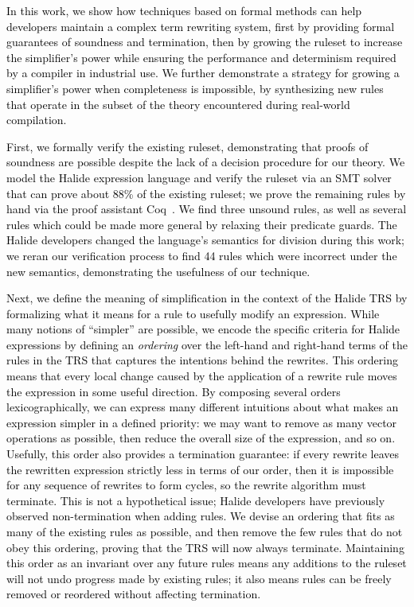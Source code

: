 \documentclass[acmsmall,review]{acmart}\settopmatter{printfolios=true,printccs=false,printacmref=false}
\newcommand{\modified}[1]{\textcolor{black}{{#1}}}
\begin{document}
\modified{ In this work, we show how techniques based on formal methods can help developers
 maintain a complex term rewriting system, first by providing formal guarantees 
 of soundness and termination, then by growing the ruleset to increase the simplifier's 
 power while ensuring the performance and determinism required by a compiler in 
 industrial use.  We further demonstrate a strategy for growing a simplifier's power
 when completeness is impossible, by synthesizing new rules that operate in
 the subset of the theory encountered during real-world compilation.}

\modified{First, we formally verify the existing 
ruleset, demonstrating that proofs of soundness are possible despite the lack of a 
decision procedure for our theory. We model the Halide expression language and verify 
the ruleset via an SMT solver that can prove about 88\% of the existing ruleset;
we prove the remaining rules by hand via the proof assistant Coq~\cite{Coq19}. We find three unsound rules, 
as well as several rules which could be made more general by relaxing their predicate guards. 
The Halide developers changed the language's semantics for division during this work; we reran our verification 
process to find 44 rules which were incorrect under the new semantics, demonstrating 
the usefulness of our technique.}

\modified{Next, we define the meaning of simplification in the context of the Halide TRS
by formalizing what it means for a rule to usefully modify an expression.  While
many notions of ``simpler'' are possible, we encode the specific criteria for Halide
expressions by defining an \emph{ordering} over the left-hand and right-hand terms of 
the rules in the TRS that captures the intentions behind the rewrites. This ordering 
means that every local change caused by the application of a rewrite rule moves the 
expression in some useful direction. By composing several orders lexicographically, 
we can express many different intuitions about what makes an expression simpler in a
defined priority: we may want to remove as many vector operations as possible, 
then reduce the overall size of the expression, and so on. Usefully, this order also provides a termination guarantee: 
if every rewrite leaves the rewritten expression strictly less in terms of our order, 
then it is impossible for any sequence of rewrites to form cycles, so the rewrite 
algorithm must terminate. This is not a hypothetical issue; Halide developers have previously
observed non-termination when adding rules.  We devise an ordering that fits as many of the existing rules as 
possible, and then remove the few rules that do not obey this ordering, proving
that the TRS will now always terminate. Maintaining this order as 
an invariant over any future rules means any additions to the ruleset will not undo 
progress made by existing rules; it also means rules can be freely removed or reordered 
without affecting termination.}
\end{document}

